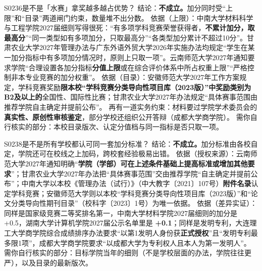 \begin{qa}{S0236}{是不是「水赛」拿奖越多越占优势？}
结论：\textbf{不成立。}加分同时受“上限”和“目录”两道闸门约束，数量堆不出分数。
依据（上限）：中南大学材料科学与工程学院2027届细则写得很死：“有多项学科竞赛荣誉获得者，\textbf{不累计加分，取最高分}”“同一类型如有多项加分，只取最高分”“各类型加分累计不超过10分”。甘肃农业大学2027年管理办法与广东外语外贸大学2026年实施办法均规定“学生在某一加分指标中有多项加分情况时，原则上只取一项”。云南师范大学2027年通知要求学院“合理设置各加分指标\textbf{分值上限}或在综合评价体系中所占权重上限”“严格控制非本专业竞赛的加分权重”。
依据（目录）：安徽师范大学2027年工作方案规定，学科竞赛奖励\textbf{限本校“学科竞赛分类导向性项目库（2023版）”中奖励类别为B2及以上的}全国性、国际性比赛；甘肃农业大学2027年办法规定“具体赛事范围由推荐学院自主确定并提前公布”。
再有一道实务约束：材料要过学院学术委员会的\textbf{真实性、原创性审核鉴定}，部分学校还组织公开答辩（成都大学商学院）。
需你自行核实的部分：本校目录版次、认定分值档与同一指标是否只取一项。
\end{qa}

\begin{qa}{S0238}{是不是所有学校都认可同一套加分标准？}
结论：\textbf{不成立。}加分标准由各校自定，学院还可在校线之上加码，跨校套经验极易出错。
依据（授权来源）：云南师范大学2027年通知明确“\textbf{学院（学部）可在上述条件基础上提高标准或增加其他要求}”；甘肃农业大学2027年办法把“具体赛事范围”交由推荐学院“自主确定并提前公布”；中南大学以本校《管理办法（试行）》（中大教字〔2021〕107号）\textbf{附件名录}认定学科竞赛；安徽师范大学则以本校“学科竞赛分类导向性项目库（2023版）”和“论文分类导向性期刊目录”（校科字〔2023〕1号）为唯一依据。
依据（差异实证）：同样是国家级竞赛二等奖排名第一，中南大学材料学院2027届细则的加分是 +0.5，湖南大学计算机学院2027届公示名单里是 \textbf{+0.1}；同样是发明专利，大连理工大学商学院综合成绩排序办法要求“以第1发明人身份获\textbf{正式授权}”且“发明专利最多限1项”，成都大学商学院要求“以成都大学为专利权人且本人为第一发明人”。
需你自行核实的部分：目标学院当年的细则（不是学校层面的办法，学院往往更严），以及目录的最新版次。
\end{qa}


